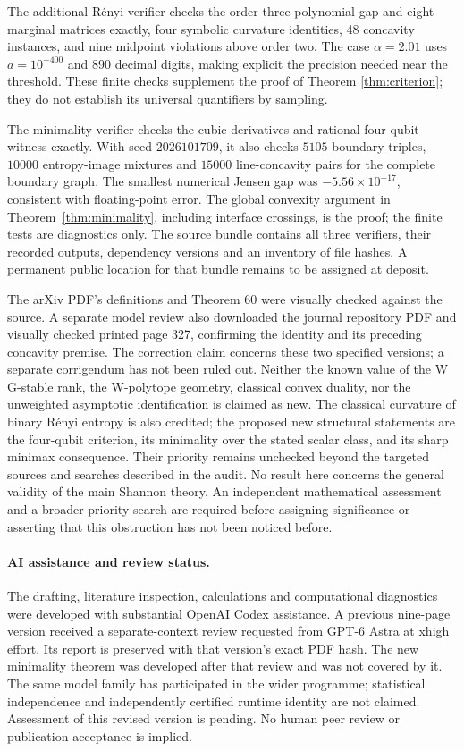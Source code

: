 \documentclass[11pt,a4paper]{article}
\begin{document}
The additional R\'enyi verifier checks the order-three polynomial
gap and eight marginal matrices exactly, four symbolic curvature
identities, 48 concavity instances, and nine midpoint violations
above order two. The case \(\alpha=2.01\) uses \(a=10^{-400}\)
and 890 decimal digits, making explicit the precision needed near
the threshold. These finite checks supplement the proof of
Theorem \ref{thm:criterion}; they do not establish its universal
quantifiers by sampling.

The minimality verifier checks the cubic derivatives and rational
four-qubit witness exactly. With seed \(2026101709\), it also checks
\(5105\) boundary triples, \(10000\) entropy-image mixtures and
\(15000\) line-concavity pairs for the complete boundary graph.
The smallest numerical Jensen gap was \(-5.56\times10^{-17}\),
consistent with floating-point error. The global convexity argument
in Theorem~\ref{thm:minimality}, including interface crossings, is
the proof; the finite tests are diagnostics only.
The source bundle contains all three verifiers, their recorded outputs,
dependency versions and an inventory of file hashes. A permanent
public location for that bundle remains to be assigned at deposit.

The arXiv PDF's definitions and Theorem 60 were visually checked
against the source. A separate model review also downloaded the journal repository PDF
and visually checked printed page 327, confirming the identity and
its preceding concavity premise. The correction
claim concerns these two specified versions; a separate corrigendum
has not been ruled out. Neither the known value of the W
G-stable rank, the W-polytope geometry, classical convex duality,
nor the unweighted asymptotic identification is claimed as new.
The classical curvature of binary R\'enyi entropy is also credited;
the proposed new structural statements are the four-qubit criterion,
its minimality over the stated scalar class, and its sharp minimax
consequence. Their priority remains unchecked
beyond the targeted sources and searches described in the audit.
No result here concerns the general validity of the main Shannon
theory. An independent mathematical assessment and a broader
priority search are required before assigning significance or
asserting that this obstruction has not been noticed before.

\paragraph{AI assistance and review status.}
The drafting, literature inspection, calculations and computational
diagnostics were developed with substantial OpenAI Codex assistance.
A previous nine-page version received a separate-context review
requested from GPT-6 Astra at xhigh effort. Its report is preserved
with that version's exact PDF hash. The new minimality theorem
was developed after that review and was not covered by it. The same
model family has participated in the wider programme; statistical
independence and independently certified runtime identity are not
claimed. Assessment of this revised version is pending. No human
peer review or publication acceptance is implied.
\end{document}
